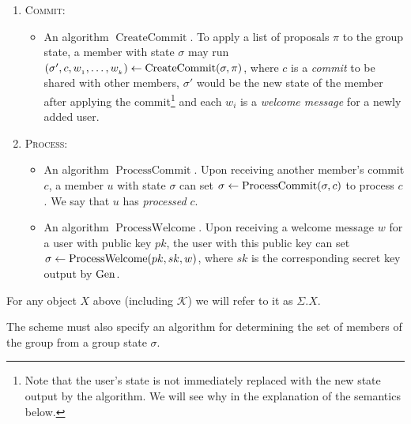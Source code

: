 \begin{definition}[PC-CGKA]
\begin{enumerate}[1.]
\begin{itemize}
			\end{itemize}
		\item[] \textsc{Commit:}
			\begin{itemize}
				\item An algorithm $\operatorname{CreateCommit}$. To apply a list of proposals $\pi$ to the group state, a member with state $\sigma$ may run $(\sigma', c, w_{_1}, \ldots, w_{_k}) \leftarrow \operatorname{CreateCommit}(\sigma, \pi)$, where $c$ is a \emph{commit} to be shared with other members, $\sigma'$ would be the new state of the member after applying the commit\footnote{Note that the user's state is not immediately replaced with the new state output by the algorithm. We will see why in the explanation of the semantics below.} and each $w_{i}$ is a \emph{welcome message} for a newly added user.
			\end{itemize}
		\item[] \textsc{Process:}
			\begin{itemize}
				\item An algorithm $\operatorname{ProcessCommit}$. Upon receiving another member's commit $c$, a member $u$ with state $\sigma$ can set $\sigma \leftarrow \operatorname{ProcessCommit}(\sigma, c)$ to process $c$. We say that $u$ has \emph{processed} $c$.
				\item An algorithm $\operatorname{ProcessWelcome}$. Upon receiving a welcome message $w$ for a user with public key $pk$, the user with this public key can set $\sigma \leftarrow \operatorname{ProcessWelcome}(pk, sk, w)$, where $sk$ is the corresponding secret key output by $\mathrm{Gen}$.
			\end{itemize}
	\end{enumerate}

	For any object $X$ above (including $\mathcal{K}$) we will refer to it as $\Sigma.X$.

	The scheme must also specify an algorithm for determining the set of members of the group from a group state $\sigma$.
\end{definition}

